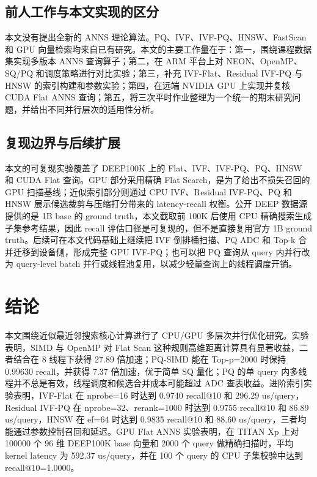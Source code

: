 \documentclass[UTF8,a4paper,10pt]{ctexart}
\begin{document}
\subsection{前人工作与本文实现的区分}

本文没有提出全新的 ANNS 理论算法。PQ、IVF、IVF-PQ、HNSW、FastScan 和 GPU 向量检索均来自已有研究。本文的主要工作量在于：第一，围绕课程数据集实现多版本 ANNS 查询算子；第二，在 ARM 平台上对 NEON、OpenMP、SQ/PQ 和调度策略进行对比实验；第三，补充 IVF-Flat、Residual IVF-PQ 与 HNSW 的索引构建和参数实验；第四，在远端 NVIDIA GPU 上实现并复核 CUDA Flat ANNS 查询；第五，将三次平时作业整理为一个统一的期末研究问题，并给出不同并行层次的适用性分析。

\subsection{复现边界与后续扩展}

本文的可复现实验覆盖了 DEEP100K 上的 Flat、IVF、IVF-PQ、PQ、HNSW 和 CUDA Flat 查询。GPU 部分采用精确 Flat Search，是为了给出不损失召回的 GPU 扫描基线；近似索引部分则通过 CPU IVF、Residual IVF-PQ、PQ 和 HNSW 展示候选裁剪与压缩打分带来的 latency-recall 权衡。公开 DEEP 数据源提供的是 1B base 的 ground truth，本文截取前 100K 后使用 CPU 精确搜索生成子集参考结果，因此 recall 评估口径是可复现的，但不是直接复用官方 1B ground truth。后续可在本文代码基础上继续把 IVF 倒排桶扫描、PQ ADC 和 Top-k 合并迁移到设备侧，形成完整 GPU IVF-PQ；也可以把 PQ 查询从 query 内并行改为 query-level batch 并行或线程池复用，以减少轻量查询上的线程调度开销。

\section{结论}

本文围绕近似最近邻搜索核心计算进行了 CPU/GPU 多层次并行优化研究。实验表明，SIMD 与 OpenMP 对 Flat Scan 这种规则高维距离计算具有显著收益，二者结合在 8 线程下获得 27.89 倍加速；PQ-SIMD 能在 Top-p=2000 时保持 0.99630 recall，并获得 7.37 倍加速，优于简单 SQ 量化；PQ 的单 query 内多线程并不总是有效，线程调度和候选合并成本可能超过 ADC 查表收益。进阶索引实验表明，IVF-Flat 在 nprobe=16 时达到 0.9740 recall@10 和 296.29 us/query，Residual IVF-PQ 在 nprobe=32、rerank=1000 时达到 0.9755 recall@10 和 86.89 us/query，HNSW 在 ef=64 时达到 0.9835 recall@10 和 88.60 us/query，三者均能通过参数控制召回和延迟。GPU Flat ANNS 实验表明，在 TITAN Xp 上对 100000 个 96 维 DEEP100K base 向量和 2000 个 query 做精确扫描时，平均 kernel latency 为 592.37 us/query，并在 100 个 query 的 CPU 子集校验中达到 recall@10=1.0000。
\end{document}
